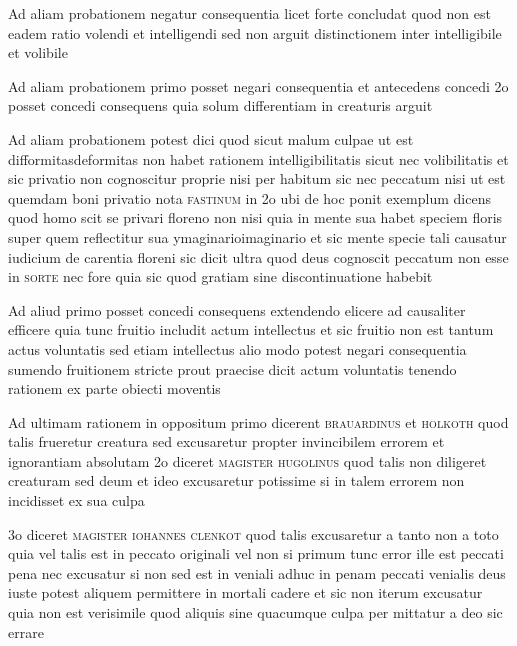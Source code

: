 \documentclass[twoside, openright]{article}
\newcommand{\name}[1]{\textsc{#1}}
\begin{document}
        \pstart
        Ad aliam probationem negatur consequentia licet forte concludat quod non est eadem ratio volendi et intelligendi sed non arguit distinctionem inter intelligibile et volibile
        \pend
     
        \pstart
        Ad aliam probationem primo posset negari consequentia et antecedens concedi  2o posset concedi consequens quia solum differentiam in creaturis arguit
        \pend
     
        \pstart
        Ad aliam probationem potest dici quod sicut malum culpae ut est difformitasdeformitas non habet rationem intelligibilitatis sicut nec volibilitatis et sic privatio non cognoscitur proprie nisi per habitum sic nec peccatum nisi ut est quemdam boni privatio nota \name{fastinum} in 2o ubi de hoc ponit exemplum dicens quod homo scit se privari floreno non nisi quia in mente sua habet speciem floris super quem reflectitur sua ymaginarioimaginario et sic mente specie tali causatur iudicium de carentia floreni sic dicit ultra quod deus cognoscit peccatum non esse in \name{sorte} nec fore quia sic quod gratiam sine discontinuatione habebit
        \pend
     
        \pstart
        Ad aliud primo posset concedi consequens extendendo elicere ad causaliter efficere quia tunc fruitio includit actum intellectus et sic fruitio non est tantum actus voluntatis sed etiam intellectus  alio modo potest negari consequentia sumendo fruitionem stricte prout praecise dicit actum voluntatis tenendo rationem ex parte obiecti moventis
        \pend
     
        \pstart
        Ad ultimam rationem in oppositum primo dicerent \name{brauardinus} et \name{holkoth} quod talis frueretur creatura sed excusaretur propter invincibilem errorem et ignorantiam absolutam  2o diceret \name{magister hugolinus} quod talis non diligeret creaturam sed deum et ideo excusaretur potissime si in talem errorem non incidisset ex sua culpa
        \pend
     
        \pstart
        3o diceret \name{magister iohannes clenkot}\index[persons]{} quod talis excusaretur a tanto non a toto quia vel talis est in peccato originali vel non si primum tunc error ille est peccati pena nec excusatur si non sed est in veniali adhuc in penam peccati venialis deus iuste potest aliquem permittere in mortali cadere et sic non iterum excusatur quia non est verisimile quod aliquis sine quacumque culpa per mittatur a deo sic errare
        \pend
     
\end{document}
